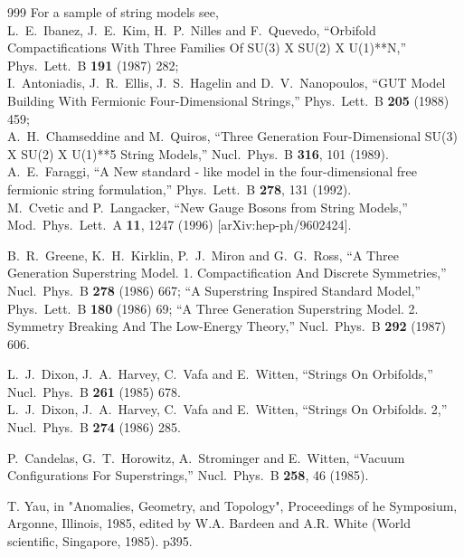 \begin{thebibliography}{999}
For a sample of string models see, \\
  L.~E.~Ibanez, J.~E.~Kim, H.~P.~Nilles and F.~Quevedo,
  ``Orbifold Compactifications With Three Families Of SU(3) X SU(2) X
  U(1)**N,''
  Phys.\ Lett.\ B {\bf 191} (1987) 282;
  \\
  I.~Antoniadis, J.~R.~Ellis, J.~S.~Hagelin and D.~V.~Nanopoulos,
  ``GUT Model Building With Fermionic Four-Dimensional Strings,''
  Phys.\ Lett.\ B {\bf 205} (1988) 459;
\\
  A.~H.~Chamseddine and M.~Quiros,
  ``Three Generation Four-Dimensional SU(3) X SU(2) X U(1)**5 String Models,''
  Nucl.\ Phys.\ B {\bf 316}, 101 (1989).
\\
  A.~E.~Faraggi,
  ``A New standard - like model in the four-dimensional free fermionic string
  formulation,''
  Phys.\ Lett.\ B {\bf 278}, 131 (1992).
\\
 M.~Cvetic and P.~Langacker,
  ``New Gauge Bosons from String Models,''
  Mod.\ Phys.\ Lett.\ A {\bf 11}, 1247 (1996)
  [arXiv:hep-ph/9602424].

  B.~R.~Greene, K.~H.~Kirklin, P.~J.~Miron and G.~G.~Ross,
  ``A Three Generation Superstring Model. 1. Compactification And Discrete
  Symmetries,''
  Nucl.\ Phys.\ B {\bf 278} (1986) 667;
  ``A Superstring Inspired Standard Model,''
  Phys.\ Lett.\ B {\bf 180} (1986) 69;
  ``A Three Generation Superstring Model. 2. Symmetry Breaking And The
  Low-Energy Theory,''
  Nucl.\ Phys.\ B {\bf 292} (1987) 606.

  L.~J.~Dixon, J.~A.~Harvey, C.~Vafa and E.~Witten,
  ``Strings On Orbifolds,''
  Nucl.\ Phys.\ B {\bf 261} (1985) 678.
 \\
 L.~J.~Dixon, J.~A.~Harvey, C.~Vafa and E.~Witten,
  ``Strings On Orbifolds. 2,''
  Nucl.\ Phys.\ B {\bf 274} (1986) 285.

  P.~Candelas, G.~T.~Horowitz, A.~Strominger and E.~Witten,
  ``Vacuum Configurations For Superstrings,''
  Nucl.\ Phys.\ B {\bf 258}, 46 (1985).

T. Yau, in "Anomalies, Geometry, and Topology", 
Proceedings of he Symposium, Argonne, Illinois, 1985, edited by
W.A. Bardeen and A.R. White (World scientific, Singapore, 1985). p395.


\end{thebibliography}
